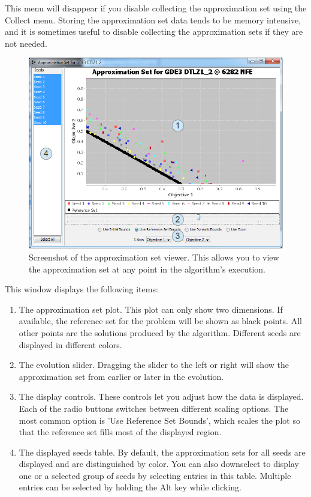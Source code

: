 \begin{important}
  This menu will disappear if you disable collecting the approximation set using the Collect menu.  Storing the approximation set data tends to be memory intensive, and it is sometimes useful to disable collecting the approximation sets if they are not needed.
\end{important}

\begin{figure}
  \includegraphics[width=\linewidth]{approximationSetViewerAnnotated.png}
  \caption{Screenshot of the approximation set viewer.  This allows you to view the approximation set at any point in the algorithm's execution.}
  \label{fig:approximationSetViewerAnnotated}
\end{figure}

This window displays the following items:

\begin{enumerate}
  \item The approximation set plot.  This plot can only show two dimensions.  If available, the reference set for the problem will be shown as black points.  All other points are the solutions produced by the algorithm.  Different seeds are displayed in different colors.
  \item The evolution slider.  Dragging the slider to the left or right will show the approximation set from earlier or later in the evolution.
  \item The display controls.  These controls let you adjust how the data is displayed.  Each of the radio buttons switches between different scaling options.  The most common option is 'Use Reference Set Bounds', which scales the plot so that the reference set fills most of the displayed region.
  \item The displayed seeds table.  By default, the approximation sets for all seeds are displayed and are distinguished by color.  You can also downselect to display one or a selected group of seeds by selecting entries in this table.  Multiple entries can be selected by holding the Alt key while clicking.
\end{enumerate}

